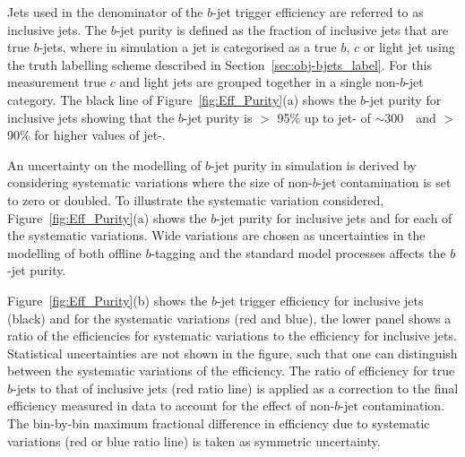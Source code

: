 Jets used in the denominator of the $b$-jet trigger efficiency are referred to as inclusive jets.
The $b$-jet purity is defined as the fraction of inclusive jets that are true $b$-jets,
where in simulation a jet is categorised as a true $b$,  $c$ or light jet using 
the truth labelling scheme described in Section~\ref{sec:obj-bjets_label}.
For this measurement true $c$ and light jets are grouped together in a single non-$b$-jet category.
The black line of Figure~\ref{fig:Eff_Purity}(a) shows the $b$-jet purity for inclusive jets showing that 
the $b$-jet purity is $>$ 95\% up to jet-\pT{} of $\sim$300~\GeV~and $>$ 90\% for higher values of jet-\pT.

An uncertainty on the modelling of $b$-jet purity in simulation is derived by considering systematic variations where the
size of non-$b$-jet contamination is set to zero or doubled.
To illustrate the systematic variation considered, Figure~\ref{fig:Eff_Purity}(a) shows the $b$-jet purity for inclusive jets and for each of the systematic variations.
Wide variations are chosen as uncertainties in the modelling of both offline $b$-tagging and the standard model processes affects the $b$-jet purity.

Figure~\ref{fig:Eff_Purity}(b) shows the $b$-jet trigger efficiency for inclusive jets (black) and
for the systematic variations (red and blue),
the lower panel shows a ratio of the efficiencies for systematic variations to the efficiency for inclusive jets.
Statistical uncertainties are not shown in the figure, such that one can distinguish between the systematic variations of the efficiency.
The ratio of efficiency for true $b$-jets to that of inclusive jets (red ratio line) is applied as a correction to the final efficiency measured in data
to account for the effect of non-$b$-jet contamination.
The bin-by-bin maximum fractional difference in efficiency due to systematic variations (red or blue ratio line) is taken as symmetric uncertainty.


